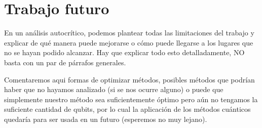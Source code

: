 \chapter{Trabajo futuro}
En un análisis autocrítico, podemos plantear todas las limitaciones del trabajo y explicar de qué manera puede mejorarse o cómo puede llegarse a los lugares que no se hayan podido alcanzar. Hay que explicar todo esto detalladamente, NO basta con un par de párrafos generales.


Comentaremos aqui formas de optimizar métodos, posibles métodos que podrían haber que no hayamos analizado (si se nos ocurre alguno) o puede que simplemente nuestro método sea suficientemente óptimo pero aún no tengamos la suficiente cantidad de qubits, por lo cual la aplicación de los métodos cuánticos quedaría para ser usada en un futuro (esperemos no muy lejano).
